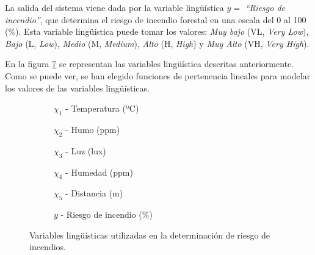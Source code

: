 La salida del sistema viene dada por la variable lingüística $y = $ \emph{``Riesgo de incendio''}, que determina el riesgo de incendio forestal en una escala del 0 al 100 (\%). Esta variable lingüística puede tomar los valores: \emph{Muy bajo} (VL, \emph{Very Low}), \emph{Bajo} (L, \emph{Low}), \emph{Medio} (M, \emph{Medium}), \emph{Alto} (H, \emph{High}) y \emph{Muy Alto} (VH, \emph{Very High}). 

En la figura \ref{fig:fire-detection-lang-variables} se representan las variables lingüística descritas anteriormente. Como se puede ver, se han elegido funciones de pertenencia lineales para modelar los valores de las variables lingüísticas.

\begin{figure}[t]
	\centering
	\begin{subfigure}[b]{0.45\textwidth}
		\setlength\figureheight{2.5cm}
		\setlength\figurewidth{6cm}
		
		\caption{$\chi_1$ - Temperatura (ºC)}
		\label{fig:temp-lang-variable}
	\end{subfigure}
	\qquad
	\begin{subfigure}[b]{0.45\textwidth}
		\setlength\figureheight{2.5cm}
		\setlength\figurewidth{6cm}
		
		\caption{$\chi_2$ - Humo (ppm)}
		\label{fig:smoke-lang-variable}
	\end{subfigure}
	
	\vspace{1 cm}
	\begin{subfigure}[b]{0.45\textwidth}
		\setlength\figureheight{2.5cm}
		\setlength\figurewidth{6cm}
		
		\caption{$\chi_3$ - Luz (lux)}
		\label{fig:light-lang-variable}
	\end{subfigure}
	\qquad
	\begin{subfigure}[b]{0.45\textwidth}
		\setlength\figureheight{2.5cm}
		\setlength\figurewidth{6cm}
		
		\caption{$\chi_4$ - Humedad (ppm)}
		\label{fig:humidity-lang-variable}
	\end{subfigure}
	
	\vspace{1 cm}
	\begin{subfigure}[b]{0.45\textwidth}
		\setlength\figureheight{2.5cm}
		\setlength\figurewidth{6cm}
		
		\caption{$\chi_5$ - Distancia (m)}
		\label{fig:distance-lang-variable}
	\end{subfigure}
	\qquad
	\begin{subfigure}[b]{0.45\textwidth}
		\setlength\figureheight{2.5cm}
		\setlength\figurewidth{6cm}
		
		\caption{$y$ - Riesgo de incendio (\%)}
		\label{fig:threat-lang-variable}
	\end{subfigure}
	\caption{Variables lingüísticas utilizadas en la determinación de riesgo de incendios.}
	\label{fig:fire-detection-lang-variables}
\end{figure}


